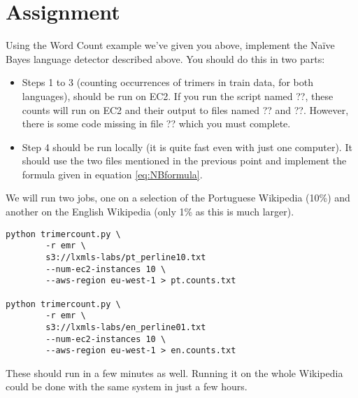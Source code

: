 \section{Assignment}

Using the Word Count example we've given you above, implement the Na\"{i}ve Bayes language detector described above. You should do this in two parts:

\begin{itemize}
	\item Steps 1 to 3 (counting occurrences of trimers in train data, for both languages), should be run on EC2. If you run the script named ??, these counts will run on EC2 and their output to files named ?? and ??. However, there is some code missing in file ?? which you must complete.
	\item Step 4 should be run locally (it is quite fast even with just one computer). It should use the two files mentioned in the previous point and implement the formula given in equation \eqref{eq:NBformula}.
\end{itemize}

%
%
%
%

We will run two jobs, one on a selection of the Portuguese Wikipedia (10\%) and
another on the English Wikipedia (only 1\% as this is much larger).

\begin{verbatim}
python trimercount.py \
        -r emr \
        s3://lxmls-labs/pt_perline10.txt
        --num-ec2-instances 10 \
        --aws-region eu-west-1 > pt.counts.txt

python trimercount.py \
        -r emr \
        s3://lxmls-labs/en_perline01.txt
        --num-ec2-instances 10 \
        --aws-region eu-west-1 > en.counts.txt
\end{verbatim}

These should run in a few minutes as well. Running it on the whole Wikipedia
could be done with the same system in just a few hours.

